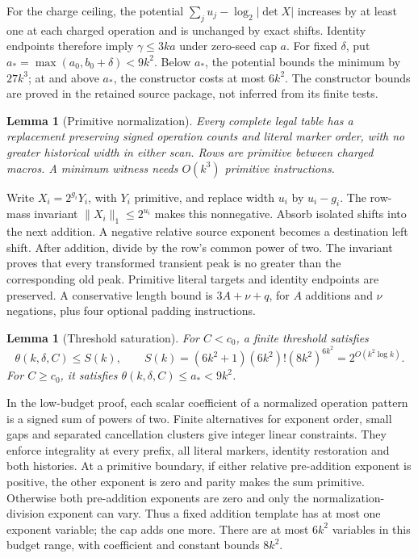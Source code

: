 \documentclass[11pt,letterpaper]{article}
\newtheorem{lemma}[theorem]{Lemma}
\begin{document}
For the charge ceiling, the potential
\(\sum_j u_j-\log_2|\det X|\) increases by at least one at each
charged operation and is unchanged by exact shifts. Identity endpoints
therefore imply \(\gamma\le3ka\) under zero-seed cap \(a\).
For fixed \(\delta\), put
\(a_*=\max(a_0,b_0+\delta)<9k^2\).
Below \(a_*\), the potential bounds the minimum by \(27k^3\);
at and above \(a_*\), the constructor costs at most \(6k^2\).
The constructor bounds are proved in the retained source package,
not inferred from its finite tests.

\begin{lemma}[Primitive normalization]\label{lem:primitive}
Every complete legal table has a replacement preserving signed
operation counts and literal marker order, with no greater historical
width in either scan. Rows are primitive between charged macros.
A minimum witness needs \(O(k^3)\) primitive instructions.
\end{lemma}
Write \(X_i=2^{g_i}Y_i\), with \(Y_i\) primitive, and replace width
\(u_i\) by \(u_i-g_i\). The row-mass invariant
\(\|X_i\|_1\le2^{u_i}\) makes this nonnegative. Absorb isolated shifts
into the next addition. A negative relative source exponent becomes
a destination left shift. After addition, divide by the row's common
power of two. The invariant proves that every transformed transient
peak is no greater than the corresponding old peak.
Primitive literal targets and identity endpoints are preserved.
A conservative length bound is \(3A+\nu+q\), for \(A\) additions
and \(\nu\) negations, plus four optional padding instructions.

\begin{lemma}[Threshold saturation]\label{lem:saturation}
For \(C<c_0\), a finite threshold satisfies
\[
\theta(k,\delta,C)\le S(k),\qquad
S(k)=(6k^2+1)(6k^2)!(8k^2)^{6k^2}
=2^{O(k^2\log k)}.
\tag{13}
\]
For \(C\ge c_0\), it satisfies \(\theta(k,\delta,C)\le a_*<9k^2\).
\end{lemma}
In the low-budget proof, each scalar coefficient of a normalized
operation pattern is a signed sum of powers of two. Finite alternatives
for exponent order, small gaps and separated cancellation clusters
give integer linear constraints. They enforce integrality at every
prefix, all literal markers, identity restoration and both histories.
At a primitive boundary, if either relative pre-addition exponent
is positive, the other exponent is zero and parity makes the sum
primitive. Otherwise both pre-addition exponents are zero and only
the normalization-division exponent can vary.
Thus a fixed addition template has at most one exponent variable;
the cap adds one more.
There are at most \(6k^2\) variables in this budget range, with
coefficient and constant bounds \(8k^2\).
\end{document}
